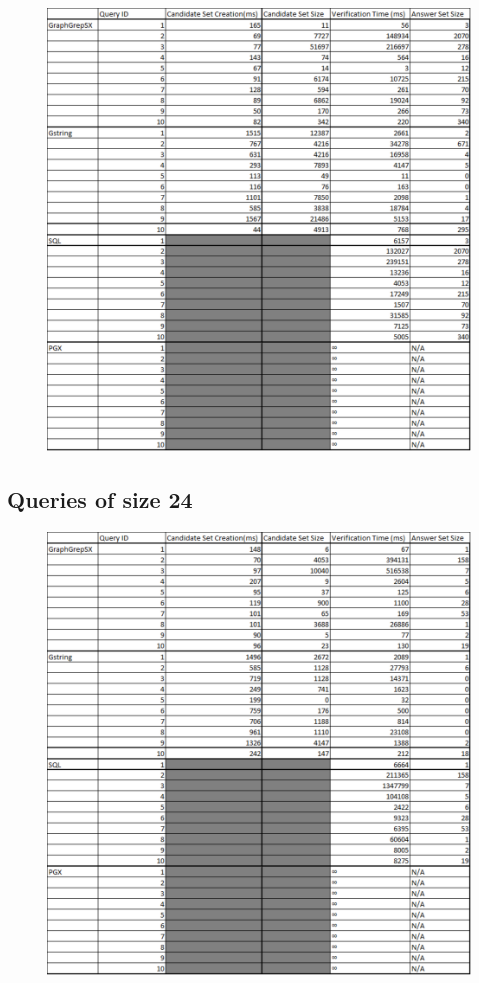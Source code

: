 \documentclass[12pt,a4paper]{report}
\let\openright=\clearpage
\begin{document}
\begin{figure}[h]
	\centering
	\includegraphics[width=1\textwidth]{../img/q16.pdf}
\end{figure}

\newpage
\subsection*{Queries of size 24}

\begin{figure}[h]
	\centering
	\includegraphics[width=1\textwidth]{../img/q24.pdf}
\end{figure}

\openright
\end{document}
